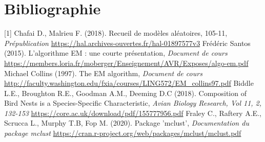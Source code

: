 \documentclass[frenchb]{report}
\newcommand{\1}{\mathbbm{1}}
\theoremstyle{definition}\newtheorem{defn}{Définition}
\theoremstyle{definition}\newtheorem{exm}{Exemple}
\theoremstyle{definition}\newtheorem{nota}{Notation}
\theoremstyle{definition}\newtheorem{rem}{Remarque}
\begin{document}
\chapter*{Bibliographie}
 

[1] Chafai D., Malrieu F. (2018). Recueil de modèles aléatoires, 105-11, \textit{Prépublication}\newline
\url{https://hal.archives-ouvertes.fr/hal-01897577v3}\newline
\break
[2] Frédéric Santos (2015). L’algorithme EM : une courte présentation, \textit{Document de cours}
\newline\url{https://members.loria.fr/moberger/Enseignement/AVR/Exposes/algo-em.pdf} \newline
\break
[3] Michael Collins (1997). The EM algorithm, \textit{Document de cours}\newline
\url{http://faculty.washington.edu/fxia/courses/LING572/EM_collins97.pdf} \newline
\break
[4] Biddle L.E., Broughton R.E., Goodman A.M., Deeming D.C (2018). Composition of Bird Nests is a Species-Specific Characteristic, \textit{Avian Biology Research, Vol 11, 2, 132-153}\newline
\url{https://core.ac.uk/download/pdf/155777956.pdf}\newline %
\break
[5] Fraley C., Raftery A.E., Scrucca L., Murphy T.B, Fop M. (2020). Package 'mclust', \textit{Documentation du package mclust}\newline
 \url{https://cran.r-project.org/web/packages/mclust/mclust.pdf} 



\pagebreak
\end{document}
